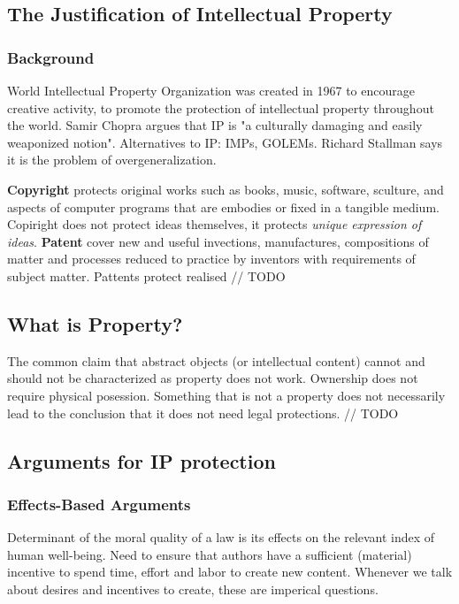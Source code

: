 \documentclass{article}
\begin{document}
\subsection{The Justification of Intellectual Property}

\subsubsection{Background}

World Intellectual Property Organization was created in 1967 to encourage creative activity, to promote the protection of intellectual property throughout the world. Samir Chopra argues that IP is "a culturally damaging and easily weaponized notion". Alternatives to IP: IMPs, GOLEMs. Richard Stallman says it is the problem of overgeneralization.

\textbf{Copyright} protects original works such as books, music, software, sculture, and aspects of computer programs that are embodies or fixed in a tangible medium. Copiright does not protect ideas themselves, it protects \textit{unique expression of ideas}. \textbf{Patent} cover new and useful invections, manufactures, compositions of matter and processes reduced to practice by inventors with requirements of subject matter. Pattents protect realised // TODO

\subsection{What is Property?}

The common claim that abstract objects (or intellectual content) cannot and should not be characterized as property does not work. Ownership does not require physical posession. Something that is not a property does not necessarily lead to the conclusion that it does not need legal protections. // TODO

\subsection{Arguments for IP protection}

\subsubsection*{Effects-Based Arguments}

Determinant of the moral quality of a law is its effects on the relevant index of human well-being. Need to ensure that authors have a sufficient (material) incentive to spend time, effort and labor to create new content. Whenever we talk about desires and incentives to create, these are imperical questions.
\end{document}
